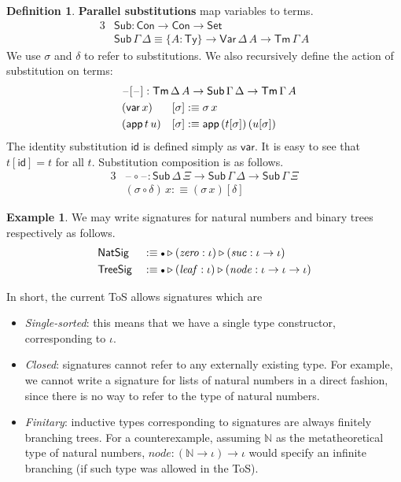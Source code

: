 \documentclass[12pt,a4paper,twoside,openany]{book}
\theoremstyle{remark}
\theoremstyle{definition}
\newtheorem{mydefinition}{Definition}
\newtheorem{myexample}{Example}
\theoremstyle{theorem}
\newcommand{\mi}[1]{\mathit{#1}}
\newcommand{\ms}[1]{\mathsf{#1}}
\newcommand{\mbb}[1]{\mathbb{#1}}
\newcommand{\id}{\mathsf{id}}
\newcommand{\Con}{\mathsf{Con}}
\newcommand{\Sub}{\mathsf{Sub}}
\newcommand{\Tm}{\mathsf{Tm}}
\newcommand{\Ty}{\mathsf{Ty}}
\newcommand{\blank}{\mathord{\hspace{1pt}\text{--}\hspace{1pt}}}
\newcommand{\Set}{\mathsf{Set}}
\newcommand{\ext}{\triangleright}
\newcommand{\emptycon}{\scaleobj{.75}\bullet}
\newcommand{\Var}{\ms{Var}}
\newcommand{\var}{\ms{var}}
\newcommand{\app}{\ms{app}}
\newcommand{\defn}{:\equiv}
\begin{document}
\begin{mydefinition} \textbf{Parallel substitutions} map variables to terms.
\begin{alignat*}{3}
&\Sub : \Con \to \Con \to \Set\\
&\Sub\,\Gamma\,\Delta \equiv \{A : \Ty\} \to \Var\,\Delta\,A \to \Tm\,\Gamma\,A
\end{alignat*}
We use $\sigma$ and $\delta$ to refer to substitutions. We also recursively
define the action of substitution on terms:
\begin{alignat*}{3}
  &\rlap{$\blank[\blank] : \Tm\,\Delta\,A \to \Sub\,\Gamma\,\Delta \to \Tm\,\Gamma\,A$}\\
  &(\var\, x)   &&[ \sigma ] \defn \sigma\,x\\
  &(\app\,t\,u) &&[ \sigma ] \defn \app\,(t[\sigma])\,(u[\sigma])
\end{alignat*}
The identity substitution $\id$ is defined simply as $\var$. It is easy to see that
$t[\id] = t$ for all $t$. Substitution composition is as follows.
\begin{alignat*}{3}
  &\blank\!\circ\!\blank : \Sub\,\Delta\,\Xi \to \Sub\,\Gamma\,\Delta \to \Sub\,\Gamma\,\Xi\\
  &(\sigma \circ \delta)\,x \defn (\sigma\,x)[\delta]
\end{alignat*}
\end{mydefinition}

\begin{myexample} We may write signatures for natural numbers and binary trees respectively as follows.
\begin{alignat*}{3}
  & \ms{NatSig}  &&\defn \emptycon \ext (\mi{zero} : \iota) \ext (\mi{suc} : \iota \to \iota)\\
  & \ms{TreeSig} &&\defn \emptycon \ext (\mi{leaf} : \iota) \ext (\mi{node} : \iota \to \iota \to \iota)
\end{alignat*}
\end{myexample}
In short, the current ToS allows signatures which are
\begin{itemize}
\item \emph{Single-sorted}: this means that we have a single type constructor, corresponding to $\iota$.
\item \emph{Closed}: signatures cannot refer to any externally existing type. For example, we cannot write a signature for lists of natural numbers in a direct fashion, since there is no way to refer to the type of natural numbers.
\item \emph{Finitary}: inductive types corresponding to signatures are always
  finitely branching trees. For a counterexample, assuming $\mbb{N}$ as the
  metatheoretical type of natural numbers, $\mi{node} : (\mathbb{N} \to \iota)
  \to \iota$ would specify an infinite branching (if such type was allowed in
  the ToS).
\end{itemize}
\end{document}
